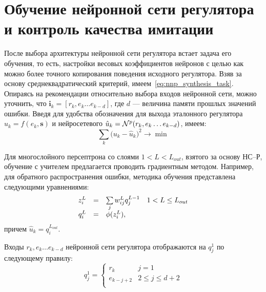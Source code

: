 \section{Обучение нейронной сети регулятора и контроль качества имитации}

После выбора архитектуры нейронной сети регулятора встает задача его
обучения, то есть, настройки весовых коэффициентов нейронов с целью
как можно более точного копирования поведения исходного регулятора.
Взяв за основу среднеквадратический критерий,
имеем~\eqref{eq:nnp_synthesis_task}.  Опираясь на рекомендации
относительно выбора входов нейронной сети, можно уточнить, что
$\mathbf{i}_k=[r_k,e_k\ldots e_{k-d}]$, где $d$ --- величина памяти
прошлых значений ошибки.  Введя для удобства обозначения для выхода
эталонного регулятора $u_k=f(e_k,\mathbf{s})$ и нейросетевого
$\hat{u}_k=\mathcal{N}^p(r_k,e_k\ldots e_{k-d})$, имеем:
\begin{equation}\label{eq:nnc-learning-criterium}
  \sum\limits_k\big(u_k-\hat{u}_k\big)^2\rightarrow\min
\end{equation}

Для многослойного персептрона со слоями $1<L<L_{out}$, взятого за
основу НС--Р, обучение с учителем предлагается проводить градиентным
методом.  Например, для обратного распространения ошибки, методика
обучения представлена следующими уравнениями:
\begin{equation}
  \label{eq:sigm_neuron_output_parts}
  \begin{array}{rcll}
    z^L_i & = & \sum\limits_j w^L_{ij}q^{L-1}_j & 1<L\le L_{out}\\
    q^L_i & = & \fa(z^L_i), & \\
  \end{array}
\end{equation}причем $\hat{u}_k=q^{L_{out}}_i$.

Входы $r_k,e_k\ldots e_{k-d}$ нейронной сети регулятора отображаются
на $q^1_j$ по следующему правилу:
\begin{equation}
  q^1_j =\left\{
  \begin{array}{ll}
    r_k & j=1 \\
    e_{k-j+2} & 2\le j\le d+2 \\
  \end{array}\right.
\end{equation}


